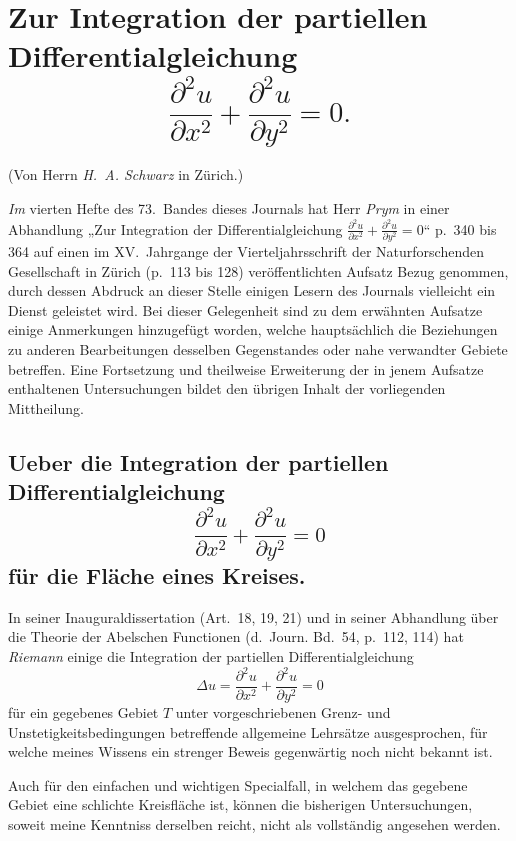 \documentclass{article}
\begin{document}
\section*{Zur Integration der partiellen Differentialgleichung
\[
\frac{\partial^2 u}{\partial x^2} + \frac{\partial^2 u}{\partial y^2} = 0.
\]}
\begin{center}
(Von Herrn \emph{H.~A. Schwarz} in Zürich.)
\end{center}

\emph{Im} vierten Hefte des 73.~Bandes dieses Journals hat Herr \emph{Prym} in einer Abhandlung „Zur Integration der Differentialgleichung $\frac{\partial^2 u}{\partial x^2} + \frac{\partial^2 u}{\partial y^2} = 0$“ p.~340 bis 364 auf einen im XV.~Jahrgange der Vierteljahrsschrift der Naturforschenden Gesellschaft in Zürich (p.~113 bis 128) veröffentlichten Aufsatz Bezug genommen, durch dessen Abdruck an dieser Stelle einigen Lesern des Journals vielleicht ein Dienst geleistet wird. Bei dieser Gelegenheit sind zu dem erwähnten Aufsatze einige Anmerkungen hinzugefügt worden, welche hauptsächlich die Beziehungen zu anderen Bearbeitungen desselben Gegenstandes oder nahe verwandter Gebiete betreffen. Eine Fortsetzung und theilweise Erweiterung der in jenem Aufsatze enthaltenen Untersuchungen bildet den übrigen Inhalt der vorliegenden Mittheilung.

\subsection*{Ueber die Integration der partiellen Differentialgleichung
\[
\frac{\partial^2 u}{\partial x^2} + \frac{\partial^2 u}{\partial y^2} = 0
\]
für die Fläche eines Kreises.}

In seiner Inauguraldissertation (Art.~18, 19, 21) und in seiner Abhandlung über die Theorie der Abelschen Functionen (d.~Journ. Bd.~54, p.~112, 114) hat \emph{Riemann} einige die Integration der partiellen Differentialgleichung
\[
\Delta u = \frac{\partial^2 u}{\partial x^2} + \frac{\partial^2 u}{\partial y^2} = 0
\]
für ein gegebenes Gebiet $T$ unter vorgeschriebenen Grenz- und Unstetigkeitsbedingungen betreffende allgemeine Lehrsätze ausgesprochen, für welche meines Wissens ein strenger Beweis gegenwärtig noch nicht bekannt ist.

Auch für den einfachen und wichtigen Specialfall, in welchem das gegebene Gebiet eine schlichte Kreisfläche ist, können die bisherigen Untersuchungen, soweit meine Kenntniss derselben reicht, nicht als vollständig angesehen werden.
\end{document}
